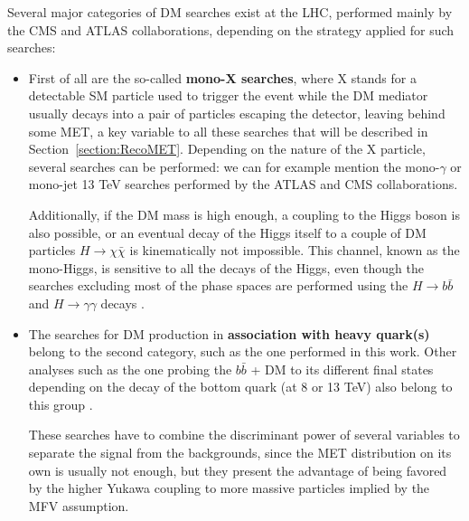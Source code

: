 \documentclass[a4paper, 10pt, openright]{report}
\begin{document}
Several major categories of \ac{DM} searches exist at the \ac{LHC}, performed mainly by the \ac{CMS} and \ac{ATLAS} collaborations, depending on the strategy applied for such searches:

\begin{itemize}
\item First of all are the so-called \textbf{mono-X searches}, where X stands for a detectable \ac{SM} particle used to trigger the event while the \ac{DM} mediator usually decays into a pair of particles escaping the detector, leaving behind some \ac{MET}, a key variable to all these searches that will be described in Section~\ref{section:RecoMET}. Depending on the nature of the X particle, several searches can be performed: we can for example mention the mono-$\gamma$ \cite{MonoGammaAtlas, MonoGammaCMS} or mono-jet \cite{MonoJetCMS, MonoJetCMS2} 13 TeV searches performed by the \ac{ATLAS} and \ac{CMS} collaborations.


Additionally, if the \ac{DM} mass is high enough, a coupling to the Higgs boson is also possible, or an eventual decay of the Higgs itself to a couple of \ac{DM} particles $H \rightarrow \chi \bar \chi$ is kinematically not impossible. This channel, known as the mono-Higgs, is sensitive to all the decays of the Higgs, even though the searches excluding most of the phase spaces are performed using the $H \rightarrow b \bar b$ and $H \rightarrow \gamma \gamma$ decays \cite{MonoHiggsAtlas, MonoHiggsCMS}. 

\item The searches for \ac{DM} production in \textbf{association with heavy quark(s)} belong to the second category, such as the one performed in this work. Other analyses such as the one probing the $b \bar b$ + DM to its different final states  depending on the decay of the bottom quark (at 8 or 13 TeV) also belong to this group \cite{PreviousDoubleTopAllLep8ATLAS, PreviousDoubleTopBottomAllLep13ATLAS}. 

These searches have to combine the discriminant power of several variables to separate the signal from the backgrounds, since the \ac{MET} distribution on its own is usually not enough, but they present the advantage of being favored by the higher Yukawa coupling to more massive particles implied by the \ac{MFV} assumption.


\end{itemize}
\end{document}

